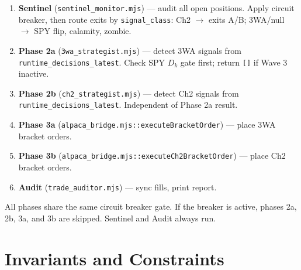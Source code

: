 \documentclass[11pt, a4paper]{article}
\begin{document}
\begin{enumerate}
  \item \textbf{Sentinel} (\texttt{sentinel\_monitor.mjs}) — audit all open positions.
        Apply circuit breaker, then route exits by \texttt{signal\_class}:
        Ch2 $\to$ exits A/B; 3WA/null $\to$ SPY flip, calamity, zombie.

  \item \textbf{Phase 2a} (\texttt{3wa\_strategist.mjs}) — detect 3WA signals from
        \texttt{runtime\_decisions\_latest}. Check SPY $D_k$ gate first; return
        \texttt{[]} if Wave 3 inactive.

  \item \textbf{Phase 2b} (\texttt{ch2\_strategist.mjs}) — detect Ch2 signals from
        \texttt{runtime\_decisions\_latest}. Independent of Phase 2a result.

  \item \textbf{Phase 3a} (\texttt{alpaca\_bridge.mjs::executeBracketOrder}) — place
        3WA bracket orders.

  \item \textbf{Phase 3b} (\texttt{alpaca\_bridge.mjs::executeCh2BracketOrder}) — place
        Ch2 bracket orders.

  \item \textbf{Audit} (\texttt{trade\_auditor.mjs}) — sync fills, print report.
\end{enumerate}

All phases share the same circuit breaker gate. If the breaker is active,
phases 2a, 2b, 3a, and 3b are skipped. Sentinel and Audit always run.

\section{Invariants and Constraints}
\end{document}
